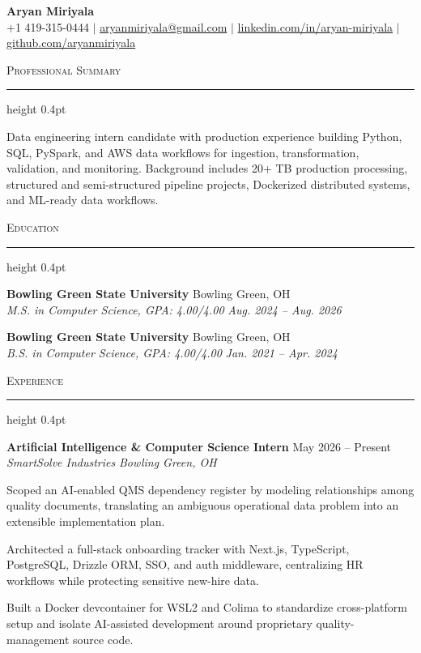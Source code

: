 \documentclass[letterpaper,11pt]{article}
\newcommand{\resumesection}[1]{%
  \par\vspace{2pt}%
  {\large\scshape #1}\par\vspace{2pt}%
  \hrule height 0.4pt\vspace{2pt}%
}
\newcommand{\resumeSubheading}[4]{
  \textbf{#1} \hfill #2\\
  \textit{#3} \hfill \textit{#4}
}
\begin{document}
\begin{center}
  {\LARGE \textbf{Aryan Miriyala}}\\[-1pt]
  \small
  +1 419-315-0444 $|$
  \href{mailto:aryanmiriyala@gmail.com}{aryanmiriyala@gmail.com} $|$
  \href{https://www.linkedin.com/in/aryan-miriyala-7788a21b6/}{linkedin.com/in/aryan-miriyala} $|$
  \href{https://github.com/aryanmiriyala}{github.com/aryanmiriyala}
\end{center}\vspace{-10pt}

\resumesection{Professional Summary}
Data engineering intern candidate with production experience building Python, SQL, PySpark, and AWS data workflows for ingestion, transformation, validation, and monitoring. Background includes 20+ TB production processing, structured and semi-structured pipeline projects, Dockerized distributed systems, and ML-ready data workflows.

\resumesection{Education}
\resumeSubheading
{Bowling Green State University}{Bowling Green, OH}
{M.S. in Computer Science, GPA: 4.00/4.00}{Aug. 2024 -- Aug. 2026}

\resumeSubheading
{Bowling Green State University}{Bowling Green, OH}
{B.S. in Computer Science, GPA: 4.00/4.00}{Jan. 2021 -- Apr. 2024}

\resumesection{Experience}
\resumeSubheading
{Artificial Intelligence \& Computer Science Intern}{May 2026 -- Present}
{SmartSolve Industries}{Bowling Green, OH}
\begin{tightitemize}
  \item Scoped an AI-enabled QMS dependency register by modeling relationships among quality documents, translating an ambiguous operational data problem into an extensible implementation plan.
  \item Architected a full-stack onboarding tracker with Next.js, TypeScript, PostgreSQL, Drizzle ORM, SSO, and auth middleware, centralizing HR workflows while protecting sensitive new-hire data.
  \item Built a Docker devcontainer for WSL2 and Colima to standardize cross-platform setup and isolate AI-assisted development around proprietary quality-management source code.
\end{tightitemize}
\end{document}
